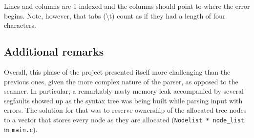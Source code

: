 \documentclass[12pt]{article}
\begin{document}
Lines and columns are 1-indexed and the columns should point to where the error begins.
Note, however, that tabs (\textbackslash t) count as if they had a length of four characters.

\subsection{Additional remarks}
Overall, this phase of the project presented itself more challenging than the previous ones,
given the more complex nature of the parser, as opposed to the scanner. In particular, a
remarkably nasty memory leak accompanied by several segfaults showed up as the
syntax tree was being built while parsing input with errors. The solution for that was to
reserve ownership of the allocated tree nodes to a vector that stores every node as they
are allocated (\texttt{Nodelist * node\_list} in \texttt{main.c}).

\printbibliography
\end{document}
